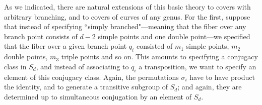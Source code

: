%
%
%
%
%

As we indicated, there are natural extensions of this basic theory to covers with arbitrary branching, and to covers of curves of any genus. For the first, suppose that instead of specifying ``simply branched"---meaning that the fiber over any branch point consists of $d-2$ simple points and one double point---we specified that the fiber over a given branch point $q_i$ consisted of $m_1$ simple points, $m_2$ double points, $m_3$ triple points and so on. This amounts to specifying a conjugacy class in $S_d$, and instead of associating to $q_i$ a transposition, we want to specify an element of this conjugacy class. Again, the permutations $\sigma_i$ have to have product the identity, and to generate a transitive subgroup of $S_d$; and again, they are determined up to simultaneous conjugation by an element of $S_d$.

